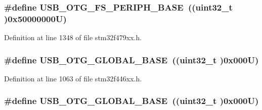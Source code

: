 \subsubsection[{\texorpdfstring{U\+S\+B\+\_\+\+O\+T\+G\+\_\+\+F\+S\+\_\+\+P\+E\+R\+I\+P\+H\+\_\+\+B\+A\+SE}{USB_OTG_FS_PERIPH_BASE}}]{\setlength{\rightskip}{0pt plus 5cm}\#define U\+S\+B\+\_\+\+O\+T\+G\+\_\+\+F\+S\+\_\+\+P\+E\+R\+I\+P\+H\+\_\+\+B\+A\+SE~((uint32\+\_\+t )0x50000000\+U)}\hypertarget{group___peripheral__memory__map_gaa86d4c80849a74938924e73937b904e7}{}\label{group___peripheral__memory__map_gaa86d4c80849a74938924e73937b904e7}


Definition at line 1348 of file stm32f479xx.\+h.

\subsubsection[{\texorpdfstring{U\+S\+B\+\_\+\+O\+T\+G\+\_\+\+G\+L\+O\+B\+A\+L\+\_\+\+B\+A\+SE}{USB_OTG_GLOBAL_BASE}}]{\setlength{\rightskip}{0pt plus 5cm}\#define U\+S\+B\+\_\+\+O\+T\+G\+\_\+\+G\+L\+O\+B\+A\+L\+\_\+\+B\+A\+SE~((uint32\+\_\+t )0x000\+U)}\hypertarget{group___peripheral__memory__map_ga044aa4388e72d9d47a03f387fb8926fb}{}\label{group___peripheral__memory__map_ga044aa4388e72d9d47a03f387fb8926fb}


Definition at line 1063 of file stm32f446xx.\+h.

\subsubsection[{\texorpdfstring{U\+S\+B\+\_\+\+O\+T\+G\+\_\+\+G\+L\+O\+B\+A\+L\+\_\+\+B\+A\+SE}{USB_OTG_GLOBAL_BASE}}]{\setlength{\rightskip}{0pt plus 5cm}\#define U\+S\+B\+\_\+\+O\+T\+G\+\_\+\+G\+L\+O\+B\+A\+L\+\_\+\+B\+A\+SE~((uint32\+\_\+t )0x000\+U)}\hypertarget{group___peripheral__memory__map_ga044aa4388e72d9d47a03f387fb8926fb}{}\label{group___peripheral__memory__map_ga044aa4388e72d9d47a03f387fb8926fb}


